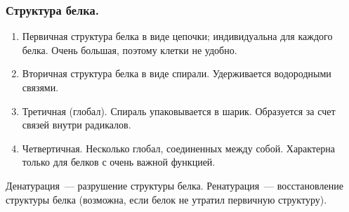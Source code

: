 \documentclass[12pt]{article}
\begin{document}
	\subsubsection{Структура белка.}
	\begin{enumerate}
		\item Первичная структура белка в виде цепочки; индивидуальна для каждого белка. Очень большая, поэтому клетки не удобно.
		\item Вторичная структура белка в виде спирали. Удерживается водородными связями.
		\item Третичная (глобал). Спираль упаковывается в шарик. Образуется за счет связей внутри радикалов.
		\item Четвертичная. Несколько глобал, соединенных между собой. Характерна только для белков с очень важной функцией.
	\end{enumerate}
	\begin{definition}
		Денатурация~--- разрушение структуры белка. Ренатурация~--- восстановление структуры белка (возможна, если белок не утратил первичную структуру).
	\end{definition}
\end{document}
